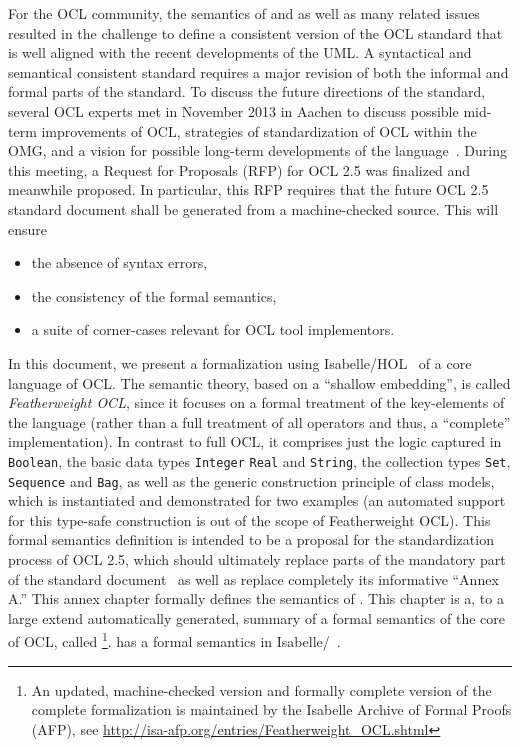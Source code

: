 For the OCL community, the semantics of  and
 as well as many related issues resulted in the
challenge to define a consistent version of the OCL standard that is
well aligned with the recent developments of the UML\@. A syntactical
and semantical consistent standard requires a major revision of both
the informal and formal parts of the standard. To discuss the future
directions of the standard, several OCL experts met in November 2013
in Aachen to discuss possible mid-term improvements of OCL, strategies
of standardization of OCL within the OMG, and a vision for possible
long-term developments of the
language~\cite{brucker.ea:summary-aachen:2013}. During this meeting, a
Request for Proposals (RFP) for OCL 2.5 was finalized and meanwhile
proposed. In particular, this RFP requires that the future OCL 2.5
standard document shall be generated from a machine-checked
source. This will ensure
\begin{itemize}
\item the absence of syntax errors,
\item the consistency of the formal semantics,
\item a suite of corner-cases relevant for OCL tool implementors.
\end{itemize}

In this document, we present a formalization using
Isabelle/HOL~\cite{nipkow.ea:isabelle:2002} of a core language of
OCL\@. The semantic theory, based on a ``shallow embedding'', is
called \emph{Featherweight OCL}, since it focuses on a formal
treatment of the key-elements of the language (rather than a full
treatment of all operators and thus, a ``complete''
implementation). In contrast to full OCL, it comprises just the logic
captured in \verb+Boolean+, the basic data types \verb+Integer+ \verb+Real+ and 
\verb+String+, the collection types \verb+Set+, \verb+Sequence+ and \verb+Bag+, 
as well as the generic construction principle of class models, which is 
instantiated and demonstrated for two examples (an automated support for 
this type-safe construction is out of the scope of Featherweight OCL).  
This formal semantics
definition is intended to be a proposal for the standardization
process of OCL 2.5, which should ultimately replace parts of the
mandatory part of the standard document~\cite{omg:ocl:2012} as well as
replace completely its informative ``Annex A.''
\endisatagafp
\isatagannexa
This annex chapter formally defines the semantics of \OCL\@. This
chapter is a, to a large extend automatically generated, summary of a
formal semantics of the core of OCL, called \FOCL\footnote{An updated,
  machine-checked version and formally complete version of the
  complete formalization is maintained by the Isabelle Archive of
  Formal Proofs (AFP), see
  \url{http://isa-afp.org/entries/Featherweight_OCL.shtml}}. \FOCL
has a formal semantics in Isabelle/\HOL~\cite{nipkow.ea:isabelle:2002}.
\endisatagannexa

